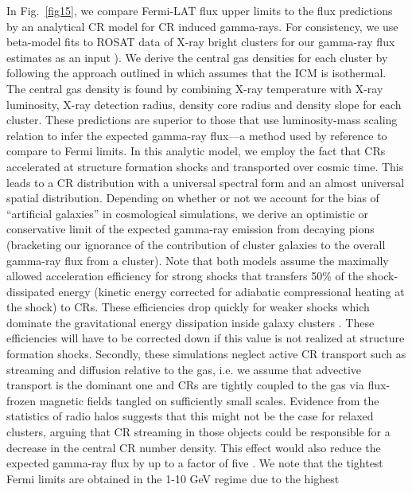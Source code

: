\documentclass[10pt,aps,pra,reprint,amsmath,amsfonts,amssymb,showpacs,nofootinbib,floatfix]{revtex4-1}
\begin{document}
In Fig.~\ref{fig15}, we compare Fermi-LAT flux upper limits to the
flux predictions by an analytical CR model \cite{2010MNRAS.409..449P}
for CR induced gamma-rays. For consistency, we use beta-model fits to
ROSAT data of X-ray bright clusters for our gamma-ray flux estimates
as an input \cite{2002ApJ...567..716R}). We derive the central gas
densities for each cluster by following the approach outlined in
\cite{1999ApJ...517..627M} which assumes that the ICM is
isothermal. The central gas density is found by combining X-ray
temperature with X-ray luminosity, X-ray detection radius, density
core radius and density slope for each cluster. These predictions are
superior to those that use luminosity-mass scaling relation to infer
the expected gamma-ray flux---a method used by reference
\cite{2010ApJ...717L..71A} to compare to Fermi limits.  In this
analytic model, we employ the fact that CRs accelerated at structure
formation shocks and transported over cosmic time. This leads to a CR
distribution with a universal spectral form and an almost universal
spatial distribution. Depending on whether or not we account for the
bias of ``artificial galaxies'' in cosmological simulations, we derive
an optimistic or conservative limit of the expected gamma-ray emission
from decaying pions (bracketing our ignorance of the contribution of
cluster galaxies to the overall gamma-ray flux from a cluster). Note
that both models assume the maximally allowed acceleration efficiency
for strong shocks that transfers 50\% of the shock-dissipated energy
(kinetic energy corrected for adiabatic compressional heating at the
shock) to CRs. These efficiencies drop quickly for weaker shocks
\cite{2007A&A...473...41E} which dominate the gravitational energy
dissipation inside galaxy clusters \cite{2006MNRAS.367..113}. These
efficiencies will have to be corrected down if this value is not
realized at structure formation shocks. Secondly, these simulations
neglect active CR transport such as streaming and diffusion relative
to the gas, i.e. we assume that advective transport is the dominant
one and CRs are tightly coupled to the gas via flux-frozen magnetic
fields tangled on sufficiently small scales. Evidence from the
statistics of radio halos suggests that this might not be the case for
relaxed clusters, arguing that CR streaming in those objects could be
responsible for a decrease in the central CR number density. This
effect would also reduce the expected gamma-ray flux by up to a factor
of five \cite{2011A&A...527A..99E}. We note that the tightest Fermi
limits are obtained in the 1-10 GeV regime due to the highest
\end{document}
